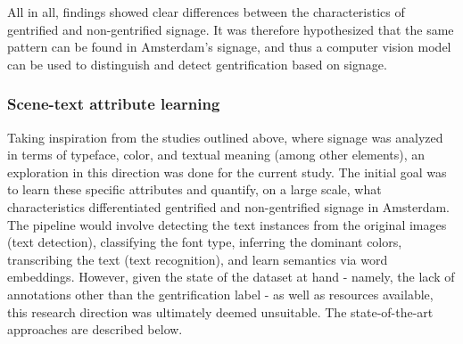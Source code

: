 All in all, findings showed clear differences between the characteristics of gentrified and non-gentrified signage. It was therefore hypothesized that the same pattern can be found in Amsterdam's signage, and thus a computer vision model can be used to distinguish and detect gentrification based on signage.

\subsubsection{Scene-text attribute learning}

Taking inspiration from the studies outlined above, where signage was analyzed in terms of typeface, color, and textual meaning (among other elements), an exploration in this direction was done for the current study. The initial goal was to learn these specific attributes and quantify, on a large scale, what characteristics differentiated gentrified and non-gentrified signage in Amsterdam. The pipeline would involve detecting the text instances from the original images (text detection), classifying the font type, inferring the dominant colors, transcribing the text (text recognition), and learn semantics via word embeddings. However, given the state of the dataset at hand - namely, the lack of annotations other than the gentrification label - as well as resources available, this research direction was ultimately deemed unsuitable. The state-of-the-art approaches are described below.

